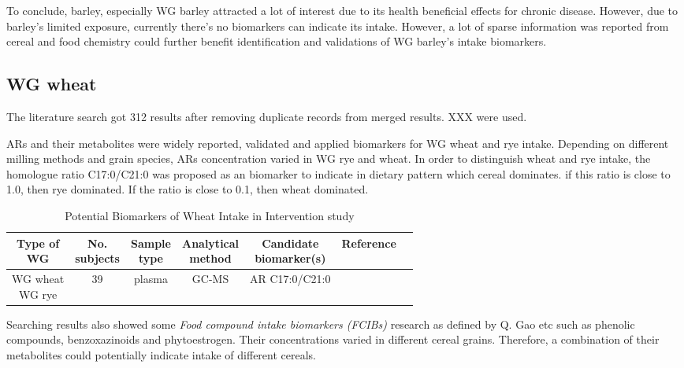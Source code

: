 To conclude, barley, especially WG barley attracted a lot of interest due to its health beneficial effects for chronic disease. However, due to barley's limited exposure, currently there's no biomarkers can indicate its intake. However, a lot of sparse information was reported from cereal and food chemistry could further benefit identification and validations of WG barley's intake biomarkers.

\subsection{WG wheat}
The literature search got 312 results after removing duplicate records from merged results. XXX were used.

ARs and their metabolites were widely reported, validated and applied biomarkers for WG wheat and rye intake. Depending on different milling methods and grain species, ARs concentration varied in WG rye and wheat. In order to distinguish wheat and rye intake, the homologue ratio C17:0/C21:0 was proposed as an biomarker to indicate in dietary pattern which cereal dominates. if this ratio is close to 1.0, then rye dominated. If the ratio is close to 0.1, then wheat dominated\cite{ISI:000376712600013}. 

\begin{table}[h!]
\begin{tabular}{|c|c|c|c|c|c|c|}
	\hline 
	\makecell{Type of\\ WG} & \makecell{No.\\subjects}  & \makecell{Sample\\type}  & \makecell{Analytical\\method}& \makecell{Candidate\\biomarker(s)} & Reference \\ 
	\hline 
	\makecell{WG wheat\\WG rye} & 39 & plasma & GC-MS & AR C17:0/C21:0 & \cite{ISI:000376712600013} \\ 
	\hline 
\end{tabular} 
\caption{Potential Biomarkers of Wheat Intake in Intervention study}
\label{table:wheat_intervention}
\end{table}


Searching results also showed some \textit{Food compound intake biomarkers (FCIBs)} research as defined by Q. Gao etc\cite{Gao2017} such as phenolic compounds\cite{ISI:000389134200003}, benzoxazinoids\cite{ISI:000394168100034} and phytoestrogen\cite{ISI:000384082300001}. Their concentrations varied in different cereal grains. Therefore, a combination of their metabolites could potentially indicate intake of different cereals.
